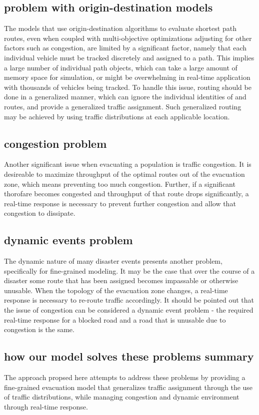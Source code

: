 \documentclass{sig-alternate-05-2015}
\begin{document}
		\subsection{problem with origin-destination models}
		The models that use origin-destination algorithms to evaluate shortest path routes, even when coupled with multi-objective optimizations adjusting for other factors such as congestion, are limited by a significant factor, namely that each individual vehicle must be tracked discretely and assigned to a path. This implies a large number of individual path objects, which can take a large amount of memory space for simulation, or might be overwhelming in real-time application with thousands of vehicles being tracked. To handle this issue, routing should be done in a generalized manner, which can ignore the individual identities of and routes, and provide a generalized traffic assignment. Such generalized routing may be achieved by using traffic distributions at each applicable location.

		\subsection{congestion problem}
		Another significant issue when evacuating a population is traffic congestion. It is desireable to maximize throughput of the optimal routes out of the evacuation zone, which means preventing too much congestion. Further, if a significant thorofare becomes congested and throughput of that route drops significantly, a real-time response is necessary to prevent further congestion and allow that congestion to dissipate. 

		\subsection{dynamic events problem}
		The dynamic nature of many disaster events presents another problem, specifically for fine-grained modeling. It may be the case that over the course of a disaster some route that has been assigned becomes impassable or otherwise unusable. When the topology of the evacuation zone changes, a real-time response is necessary to re-route traffic accordingly. It should be pointed out that the issue of congestion can be considered a dynamic event problem - the required real-time response for a blocked road and a road that is unusable due to congestion is the same. 

		\subsection{how our model solves these problems summary}
		The approach propsed here attempts to address these problems by providing a fine-grained evacuation model that generalizes traffic assignment through the use of traffic distributions, while managing congestion and dynamic environment through real-time response.	
	
\end{document}
